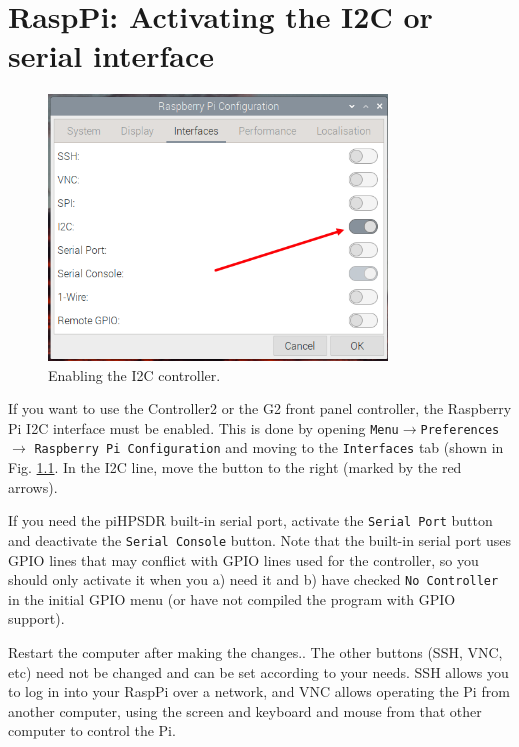 \documentclass[12pt]{book}
\def\rett#1{\texttt{\color{red}#1}}
\def\pH{pi\-HPSDR\xspace}
\begin{document}
\chapter[RaspPi: Activating I2C]{RaspPi: Activating the I2C or serial interface}
\label{sec:i2c}

\begin{figure}[ht]
\center
\includegraphics[width=9cm]{piEnableI2C.png}
\caption{Enabling the I2C controller.}
\label{fig:piEnableI2C}
\end{figure}

If you want to use the Controller2 or the G2 front panel controller, the Raspberry Pi I2C interface
must be enabled. This is done by opening \texttt{Menu}$\to$\texttt{Preferences}$\to$
\texttt{Raspberry Pi Configuration} and moving to the \texttt{Interfaces} tab
(shown in Fig. \ref{fig:piEnableI2C}. In the I2C line, move the button to the right
(marked by the red arrows).

If you need the \pH built-in serial port, activate the \rett{Serial Port} button and deactivate
the \rett{Serial Console} button. Note that the built-in serial port uses GPIO lines that may
conflict with GPIO lines used for the controller, so
you should only activate it when you a) need it and b) have checked \rett{No Controller} in the
initial GPIO menu (or have not compiled the program with GPIO support).

Restart the computer after making the changes..
The other buttons (SSH, VNC, etc) need not be changed and can be set according to your needs. SSH allows
you to log in into your RaspPi over a network, and VNC allows operating the Pi from another computer,
using the screen and keyboard and mouse from that other computer to control the Pi.

\end{document}
